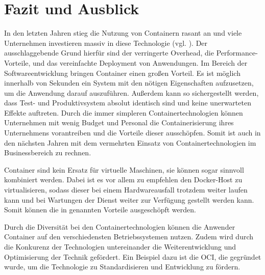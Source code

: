 \section{Fazit und Ausblick} 
\label{sec:Fazit}
In den letzten Jahren stieg die Nutzung von Containern rasant an und viele Unternehmen investieren massiv in diese Technologie (vgl. ). Der ausschlaggebende Grund hierfür sind der verringerte Overhead, die Performance-Vorteile, und das vereinfachte Deployment von Anwendungen.  Im Bereich der Softwareentwicklung bringen Container einen großen Vorteil. Es ist möglich innerhalb von Sekunden ein System mit den nötigen Eigenschaften aufzusetzen, um die Anwendung darauf auszuführen. Außerdem kann so sichergestellt werden, dass Test- und Produktivsystem absolut identisch sind und keine unerwarteten Effekte auftreten. Durch die immer simpleren Containertechnologien können Unternehmen mit wenig Budget und Personal die Containerisierung ihres Unternehmens vorantreiben und die Vorteile dieser ausschöpfen. Somit ist auch in den nächsten Jahren mit dem vermehrten Einsatz von Containertechnologien im Businessbereich zu rechnen. 

Container sind kein Ersatz für virtuelle Maschinen, sie können sogar sinnvoll kombiniert werden. Dabei ist es vor allem zu empfehlen den Docker-Host zu virtualisieren, sodass dieser bei einem Hardwareausfall trotzdem weiter laufen kann und bei Wartungen der Dienst weiter zur Verfügung gestellt werden kann. Somit können die in  genannten Vorteile ausgeschöpft werden.

Durch die Diversität bei den Containertechnologien können die Anwender Container auf den verschiedensten Betriebssystemen nutzen. Zudem wird durch die Konkurenz der Technologien untereinander die Weiterentwicklung und Optimisierung der Technik gefördert. Ein Beispiel dazu ist die \ac{OCI}, die gegründet wurde, um die Technologie zu Standardisieren und Entwicklung zu fördern.

